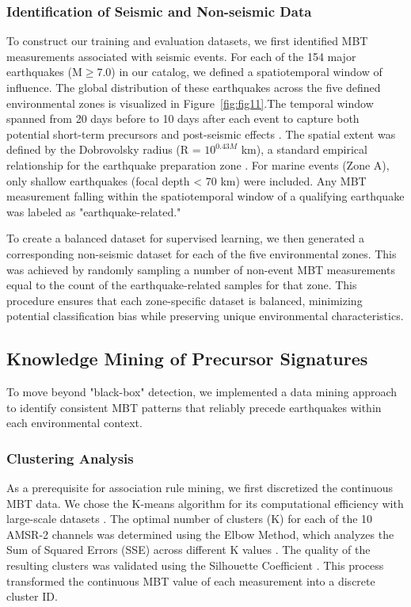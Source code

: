 \documentclass[preprint,review,12pt,authoryear]{elsarticle}
\begin{document}
\subsubsection{Identification of Seismic and Non-seismic Data}\label{sec:data_identification}
To construct our training and evaluation datasets, we first identified MBT measurements associated with seismic events. For each of the 154 major earthquakes (M$\ge$7.0) in our catalog, we defined a spatiotemporal window of influence. The global distribution of these earthquakes across the five defined environmental zones is visualized in Figure~\ref{fig:fig11}.The temporal window spanned from 20 days before to 10 days after each event to capture both potential short-term precursors and post-seismic effects \citep{akhoondzadehMultiPrecursorsAnalysis2018,qiSpatiotemporallyWeightedTwostep2020}. The spatial extent was defined by the Dobrovolsky radius (R = $10^{0.43M}$ km), a standard empirical relationship for the earthquake preparation zone \citep{dobrovolskyEstimationSizeEarthquake1979}. For marine events (Zone A), only shallow earthquakes (focal depth < 70 km) were included. Any MBT measurement falling within the spatiotemporal window of a qualifying earthquake was labeled as "earthquake-related."

To create a balanced dataset for supervised learning, we then generated a corresponding non-seismic dataset for each of the five environmental zones. This was achieved by randomly sampling a number of non-event MBT measurements equal to the count of the earthquake-related samples for that zone. This procedure ensures that each zone-specific dataset is balanced, minimizing potential classification bias while preserving unique environmental characteristics.

\subsection{Knowledge Mining of Precursor Signatures}\label{sec:knowledge_mining}
To move beyond "black-box" detection, we implemented a data mining approach to identify consistent MBT patterns that reliably precede earthquakes within each environmental context.

\subsubsection{Clustering Analysis}\label{sec:clustering}
As a prerequisite for association rule mining, we first discretized the continuous MBT data. We chose the K-means algorithm for its computational efficiency with large-scale datasets \citep{hanConceptsTechniques2006}. The optimal number of clusters (K) for each of the 10 AMSR-2 channels was determined using the Elbow Method, which analyzes the Sum of Squared Errors (SSE) across different K values \citep{thorndikeWhoBelongsFamily1953}. The quality of the resulting clusters was validated using the Silhouette Coefficient \citep{rousseeuwSilhouettesGraphicalAid1987}. This process transformed the continuous MBT value of each measurement into a discrete cluster ID.
\end{document}
